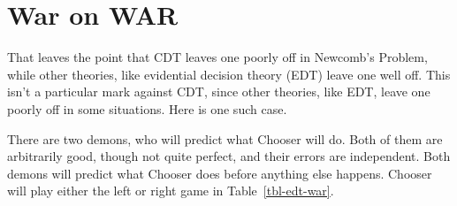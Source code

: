 \documentclass[
  12pt,
  letterpaper,
  DIV=11,
  numbers=noendperiod]{scrreprt}
\begin{document}
\section{War on WAR}\label{sec-war-on-war}

That leaves the point that CDT leaves one poorly off in Newcomb's
Problem, while other theories, like evidential decision theory (EDT)
leave one well off. This isn't a particular mark against CDT, since
other theories, like EDT, leave one poorly off in some situations. Here
is one such case.

There are two demons, who will predict what Chooser will do. Both of
them are arbitrarily good, though not quite perfect, and their errors
are independent. Both demons will predict what Chooser does before
anything else happens. Chooser will play either the left or right game
in Table~\ref{tbl-edt-war}.

\begin{table}

\caption{\label{tbl-edt-war}A Newcomb problem with two demons.}

\begin{minipage}[t]{0.50\linewidth}



\end{minipage}%
%
\begin{minipage}[t]{0.50\linewidth}



\end{minipage}%

\end{table}%
\end{document}
